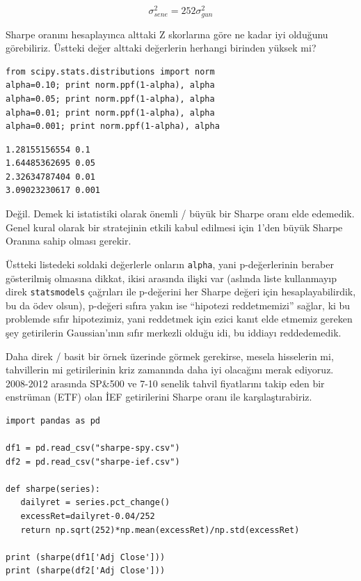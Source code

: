 \documentclass[12pt,fleqn]{article}\usepackage{../../common}
\begin{document}
$$ \sigma_{sene}^2 = 252 \sigma_{gun}^2 $$

Sharpe oranını hesaplayınca alttaki Z skorlarına göre ne kadar iyi olduğunu
görebiliriz. Üstteki değer alttaki değerlerin herhangi birinden yüksek mi?

\begin{verbatim}
from scipy.stats.distributions import norm
alpha=0.10; print norm.ppf(1-alpha), alpha
alpha=0.05; print norm.ppf(1-alpha), alpha
alpha=0.01; print norm.ppf(1-alpha), alpha
alpha=0.001; print norm.ppf(1-alpha), alpha
\end{verbatim}

\begin{verbatim}
1.28155156554 0.1
1.64485362695 0.05
2.32634787404 0.01
3.09023230617 0.001
\end{verbatim}

Değil. Demek ki istatistiki olarak önemli / büyük bir Sharpe oranı elde
edemedik. Genel kural olarak bir stratejinin etkili kabul edilmesi için
1'den büyük Sharpe Oranına sahip olması gerekir. 

Üstteki listedeki soldaki değerlerle onların \verb!alpha!, yani
p-değerlerinin beraber gösterilmiş olmasına dikkat, ikisi arasında ilişki
var (aslında liste kullanmayıp direk \verb!statsmodels! çağrıları ile
p-değerini her Sharpe değeri için hesaplayabilirdik, bu da ödev olsun),
p-değeri sıfıra yakın ise ``hipotezi reddetmemizi'' sağlar, ki bu problemde
sıfır hipotezimiz, yani reddetmek için ezici kanıt elde etmemiz gereken
şey getirilerin Gaussian'ının sıfır merkezli olduğu idi, bu iddiayı
reddedemedik.

Daha direk / basit bir örnek üzerinde görmek gerekirse, mesela hisselerin
mi, tahvillerin mi getirilerinin kriz zamanında daha iyi olacağını merak
ediyoruz. 2008-2012 arasında SP\&500 ve 7-10 senelik tahvil fiyatlarını
takip eden bir enstrüman (ETF) olan İEF getirilerini Sharpe oranı
ile karşılaştırabiriz.

\begin{verbatim}
import pandas as pd

df1 = pd.read_csv("sharpe-spy.csv")
df2 = pd.read_csv("sharpe-ief.csv")

def sharpe(series):
   dailyret = series.pct_change()
   excessRet=dailyret-0.04/252
   return np.sqrt(252)*np.mean(excessRet)/np.std(excessRet)

print (sharpe(df1['Adj Close']))
print (sharpe(df2['Adj Close']))
\end{verbatim}
\end{document}

